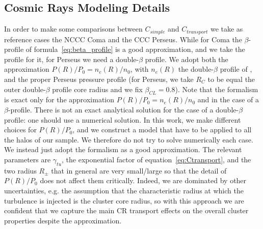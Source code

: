 \documentclass[traditabstract]{aa}
\begin{document}
\begin{appendix}
\section{Cosmic Rays Modeling Details}
\label{app:B}

In order to make some comparisons between $C_{simple}$ and $C_{transport}$ we take as reference cases the NCCC Coma and the CCC Perseus. While for Coma the $\beta$-profile of formula~\ref{eq:beta_profile} is a good approximation, and we take the \cite{1992A&A...259L..31B} profile for it, for Perseus we need a double-$\beta$ profile. We adopt both the approximation $P(R)/P_{0}=n_{e}(R)/n_{0}$, with $n_{e}(R)$ the double-$\beta$ profile of \cite{2003ApJ...590..225C}, and the proper Perseus pressure profile (for Perseus, we take $R_{C}$ to be equal the outer double-$\beta$ profile core radius and we fix $\beta_{CL}=0.8$). Note that the \cite{2011A&A...527A..99E} formalism is exact only for the approximation $P(R)/P_{0}=n_{e}(R)/n_{0}$ and in the case of a $\beta$-profile. There is not an exact analytical solution for the case of a double-$\beta$ profile: one should use a numerical solution. In this work, we make different choices for $P(R)/P_{0}$, and we construct a model that have to be applied to all the halos of our sample. We therefore do not try to solve numerically each case. We instead just adopt the \cite{2011A&A...527A..99E} formalism as a good approximation. The relevant parameters are $\gamma_{tu}$, the exponential factor of equation~\ref{eq:Ctransport}, and the two radius $R_{\pm}$ that in general are very small/large so that the detail of $P(R)/P_{0}$ does not affect them critically. Indeed, we are dominated by other uncertainties, e.g. the assumption that the characteristic radius at which the turbulence is injected is the cluster core radius, so with this approach we are confident that we capture the main CR transport effects on the overall cluster properties despite the approximation.


\end{appendix}
\end{document}
